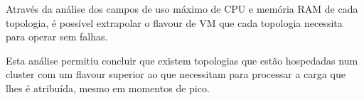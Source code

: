 Através da análise dos campos de uso máximo de \ac{CPU} e memória RAM de cada topologia, é possível
extrapolar o \gls{flavour} de \ac{VM} que cada topologia necessita para operar sem falhas.

Esta análise permitiu concluir que existem topologias que estão hospedadas num \gls{cluster}
com um \gls{flavour} superior ao que necessitam para processar a carga que lhes é atribuída,
mesmo em momentos de pico. 

